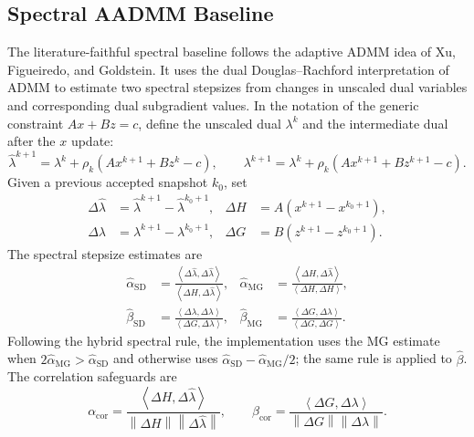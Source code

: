 \documentclass[11pt]{article}
\newcommand{\norm}[1]{\left\lVert #1 \right\rVert}
\newcommand{\ip}[2]{\left\langle #1,#2 \right\rangle}
\begin{document}
\subsection{Spectral AADMM Baseline}

The literature-faithful spectral baseline follows the adaptive ADMM idea of
Xu, Figueiredo, and Goldstein.  It uses the dual Douglas--Rachford
interpretation of ADMM to estimate two spectral stepsizes from changes in
unscaled dual variables and corresponding dual subgradient values.  In the
notation of the generic constraint $Ax+Bz=c$, define the unscaled dual
$\lambda^k$ and the intermediate dual after the $x$ update:
\begin{equation}
    \widehat{\lambda}^{k+1}
    =
    \lambda^k+\rho_k(Ax^{k+1}+Bz^k-c),
    \qquad
    \lambda^{k+1}
    =
    \lambda^k+\rho_k(Ax^{k+1}+Bz^{k+1}-c).
\end{equation}
Given a previous accepted snapshot $k_0$, set
\begin{align}
    \Delta\widehat{\lambda}
    &=\widehat{\lambda}^{k+1}-\widehat{\lambda}^{k_0+1},
    &
    \Delta H
    &=A(x^{k+1}-x^{k_0+1}),\\
    \Delta\lambda
    &=\lambda^{k+1}-\lambda^{k_0+1},
    &
    \Delta G
    &=B(z^{k+1}-z^{k_0+1}).
\end{align}
The spectral stepsize estimates are
\begin{align}
    \widehat{\alpha}_{\mathrm{SD}}
    &=
    \frac{\ip{\Delta\widehat{\lambda}}{\Delta\widehat{\lambda}}}
         {\ip{\Delta H}{\Delta\widehat{\lambda}}},
    &
    \widehat{\alpha}_{\mathrm{MG}}
    &=
    \frac{\ip{\Delta H}{\Delta\widehat{\lambda}}}
         {\ip{\Delta H}{\Delta H}},\\
    \widehat{\beta}_{\mathrm{SD}}
    &=
    \frac{\ip{\Delta\lambda}{\Delta\lambda}}
         {\ip{\Delta G}{\Delta\lambda}},
    &
    \widehat{\beta}_{\mathrm{MG}}
    &=
    \frac{\ip{\Delta G}{\Delta\lambda}}
         {\ip{\Delta G}{\Delta G}}.
\end{align}
Following the hybrid spectral rule, the implementation uses the MG estimate
when $2\widehat{\alpha}_{\mathrm{MG}}>\widehat{\alpha}_{\mathrm{SD}}$ and
otherwise uses
$\widehat{\alpha}_{\mathrm{SD}}-\widehat{\alpha}_{\mathrm{MG}}/2$; the same
rule is applied to $\widehat{\beta}$.  The correlation safeguards are
\begin{equation}
    \alpha_{\mathrm{cor}}
    =
    \frac{\ip{\Delta H}{\Delta\widehat{\lambda}}}
         {\norm{\Delta H}\norm{\Delta\widehat{\lambda}}},
    \qquad
    \beta_{\mathrm{cor}}
    =
    \frac{\ip{\Delta G}{\Delta\lambda}}
         {\norm{\Delta G}\norm{\Delta\lambda}}.
\end{equation}
\end{document}
